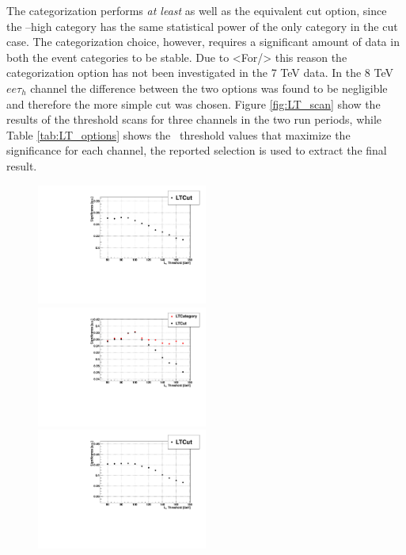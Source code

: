The categorization performs \emph{at least} as well as the equivalent cut option, since the \LT--high category has the same statistical power of the only category in the cut case. The categorization choice, however, requires a significant amount of data in both the event categories to be stable. Due to <For/> this reason the categorization option has not been investigated in the 7 TeV data. In the 8 TeV $ee\tau_h$ channel the difference between the two options was found to be negligible and therefore the more simple cut was chosen. Figure \ref{fig:LT_scan} show the results of the threshold scans for three channels in the two run periods, while Table \ref{tab:LT_options} shows the \LT\ threshold values that maximize the significance for each channel, the reported selection is used to extract the final result.

\begin{figure}
  \includegraphics[width=0.5\textwidth]{4_Analisys/pics/7TeV/limits/mmt.pdf}
  \includegraphics[width=0.5\textwidth]{4_Analisys/pics/8TeV/limits/mmt.pdf} \\
  \includegraphics[width=0.5\textwidth]{4_Analisys/pics/7TeV/limits/emt.pdf}

\end{figure}
